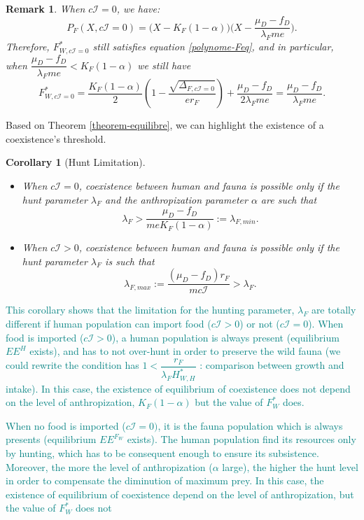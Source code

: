 \documentclass{article}
\newcommand{\lfw}{\lambda_{F}}
\newcommand{\lfw}{\lambda_{F}}
\newcommand{\marc}[1]{\textcolor{teal}{#1}}
\newtheorem{remark}{Remark}
\newtheorem{cor}{Corollary}
\begin{document}
\begin{remark}\label{remark-Feq}
When $c\mathcal{I}=0$, we have:
$$
P_F(X, c\mathcal{I}=0) = \Big(X-K_F(1-\alpha) \Big) \Big(X - \dfrac{\mu_D - f_D}{\lfw m e} \Big).
$$
Therefore, $F^*_{W,c\mathcal{I} =0}$ still satisfies equation \eqref{polynome-Feq}, and in particular, when $\dfrac{\mu_D - f_D}{\lfw m e} < K_F(1-\alpha)$ we still have
$$
F^*_{W, c\mathcal{I} =0} = \dfrac{K_F(1-\alpha)}{2}\left(1 - \dfrac{\sqrt{\Delta_{F, c\mathcal{I} = 0}}}{er_F}\right) + \dfrac{\mu_D - f_D}{2\lfw m e} = \dfrac{\mu_D - f_D}{\lfw m e}.
$$ 
\end{remark}

Based on Theorem \ref{theorem-equilibre}, we can highlight the existence of a coexistence's threshold.
\begin{cor}[Hunt Limitation]

\begin{itemize}
\item When $c\mathcal{I} = 0$, coexistence between human and fauna is possible only if the hunt parameter $\lfw$ and the anthropization parameter $\alpha$ are such that
$$
\lfw > \dfrac{\mu_D - f_D}{m e K_F(1-\alpha)} := \lambda_{F, min}.
$$
\item When $c\mathcal{I}>0$, coexistence between human and fauna is possible only if the hunt parameter $\lfw$ is such that
$$
\lambda_{F, max} := \dfrac{(\mu_D - f_D) r_F}{m c\mathcal{I}} > \lfw.
$$
\end{itemize}
\end{cor}

\marc{This corollary shows that the limitation for the hunting parameter, $\lfw$ are totally different if human population can import food ($c\mathcal{I} > 0$) or not ($c\mathcal{I} = 0$). When food is imported ($c\mathcal{I} > 0$), a human population is always present (equilibrium $EE^{H}$ exists), and has to not over-hunt in order to preserve the wild fauna (we could rewrite the condition has $1 < \dfrac{r_F}{\lfw H^*_{W, H}}$ : comparison between growth and intake). In this case, the existence of equilibrium of coexistence does not depend on the level of anthropization, $K_F(1-\alpha)$ but the value of $F^*_W$ does.}

\marc{When no food is imported ($c\mathcal{I} = 0)$, it is the fauna population which is always presents (equilibrium $EE^{F_W}$ exists). The human population find its resources only by hunting, which has to be consequent enough to ensure its subsistence. Moreover, the more the level of anthropization ($\alpha$ large), the higher the hunt level in order to compensate the diminution of maximum prey. In this case, the existence of equilibrium of coexistence depend on the level of anthropization, but the value of $F^*_W$ does not }
\end{document}

